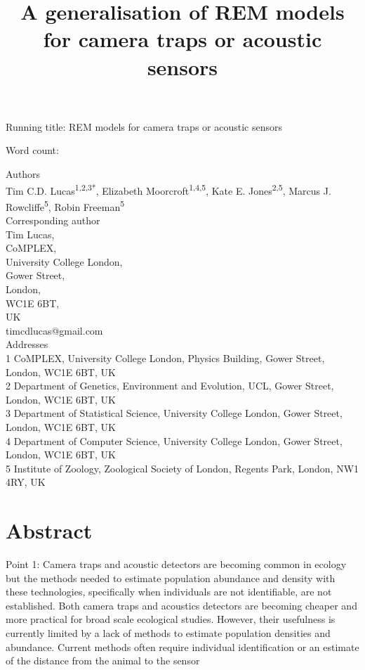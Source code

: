\documentclass[a4paper,10pt,reqno,oneside]{amsart}
\begin{document}
\title{A generalisation of REM models for camera traps or acoustic sensors}
\maketitle

Running title: REM models for camera traps or acoustic sensors

Word count:

Authors\\
Tim C.D. Lucas\textsuperscript{1,2,3*}, Elizabeth Moorcroft\textsuperscript{1,4,5}, Kate E. Jones\textsuperscript{2,5}, Marcus J. Rowcliffe\textsuperscript{5}, Robin Freeman\textsuperscript{5}\\

Corresponding author\\
Tim Lucas,\\
CoMPLEX,\\
University College London,\\
Gower Street,\\
London,\\
WC1E 6BT, \\
UK\\
timcdlucas@gmail.com\\


Addresses\\
1 CoMPLEX, University College London, Physics Building, Gower Street, London, WC1E 6BT, UK\\ 
2 Department of Genetics, Environment and Evolution, UCL, Gower Street, London, WC1E 6BT, UK\\ 
3 Department of Statistical Science, University College London, Gower Street, London, WC1E 6BT, UK\\ 
4 Department of Computer Science, University College London, Gower Street, London, WC1E 6BT, UK\\ 
5 Institute of Zoology, Zoological Society of London, Regents Park, London, NW1 4RY, UK

\clearpage
\section{Abstract}
Point 1: Camera traps and acoustic detectors are becoming common in ecology but the methods needed to estimate population abundance and density with these technologies, specifically when individuals are not identifiable, are not established. Both camera traps and acoustics detectors are becoming cheaper and more practical for broad scale ecological studies. However, their usefulness is currently limited by a lack of methods to estimate population densities and abundance. Current methods often require individual identification or an estimate of the distance from the animal to the sensor
\end{document}
